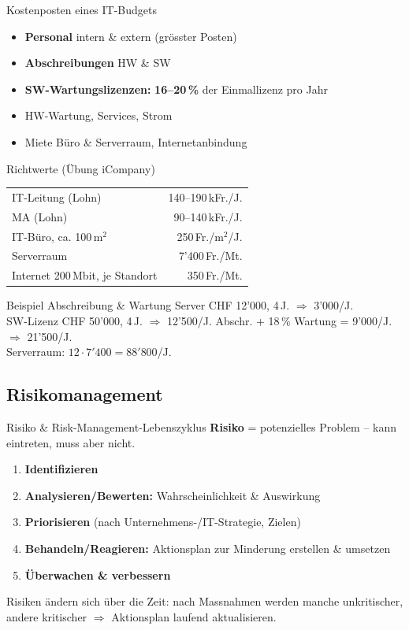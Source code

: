 \documentclass[a4paper, fontsize=7pt]{scrartcl}
\renewcommand*{\arraystretch}{1.5}  %
\begin{document}
\begin{mainbox}{Kostenposten eines IT-Budgets}
\begin{itemize}
    \item \textbf{Personal} intern \& extern (grösster Posten)
    \item \textbf{Abschreibungen} HW \& SW
    \item \textbf{SW-Wartungslizenzen:} \textbf{16--20\,\%} der
          Einmallizenz pro Jahr
    \item HW-Wartung, Services, Strom
    \item Miete Büro \& Serverraum, Internetanbindung
\end{itemize}
\end{mainbox}

\begin{subbox}{Richtwerte (Übung iCompany)}
\renewcommand*{\arraystretch}{1.1}
\begin{tabularx}{\linewidth}{@{}X r@{}}
IT-Leitung (Lohn) & 140--190\,kFr./J. \\
MA (Lohn) & 90--140\,kFr./J. \\
IT-Büro, ca. 100\,m$^2$ & 250\,Fr./m$^2$/J. \\
Serverraum & 7'400\,Fr./Mt. \\
Internet 200\,Mbit, je Standort & 350\,Fr./Mt. \\
\end{tabularx}
\end{subbox}

\begin{subbox}{Beispiel Abschreibung \& Wartung}
Server CHF 12'000, 4\,J. $\Rightarrow$ 3'000/J.\\
SW-Lizenz CHF 50'000, 4\,J. $\Rightarrow$ 12'500/J. Abschr.
+ 18\,\% Wartung = 9'000/J. $\Rightarrow$ 21'500/J.\\
Serverraum: $12 \cdot 7'400 = 88'800$/J.
\end{subbox}

\subsection{Risikomanagement}

\begin{mainbox}{Risiko \& Risk-Management-Lebenszyklus}
\textbf{Risiko} = potenzielles Problem -- kann eintreten, muss aber nicht.
\begin{enumerate}
    \item \textbf{Identifizieren}
    \item \textbf{Analysieren/Bewerten:} Wahrscheinlichkeit \& Auswirkung
    \item \textbf{Priorisieren} (nach Unternehmens-/IT-Strategie, Zielen)
    \item \textbf{Behandeln/Reagieren:} Aktionsplan zur Minderung erstellen
          \& umsetzen
    \item \textbf{Überwachen \& verbessern}
\end{enumerate}
Risiken ändern sich über die Zeit: nach Massnahmen werden manche
unkritischer, andere kritischer $\Rightarrow$ Aktionsplan laufend
aktualisieren.
\end{mainbox}
\end{document}
